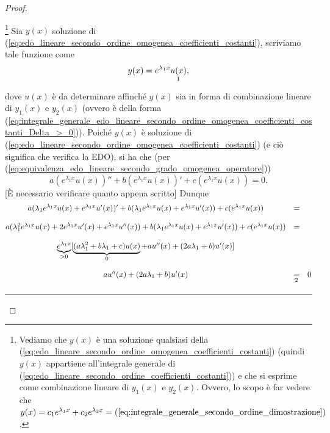 \begin{proof}
\begin{enumerate}
		
		
		\footnote{Vediamo che $y(x)$ è una soluzione qualsiasi della (\ref{eq:edo_lineare_secondo_ordine_omogenea_coefficienti_costanti}) (quindi $y(x)$ appartiene all'integrale generale di (\ref{eq:edo_lineare_secondo_ordine_coefficienti_costanti})) e che si esprime come combinazione lineare di $y_1(x)$ e $y_2(x)$. Ovvero, lo scopo è far vedere che $y(x)=c_1 e^{\lambda_1x}+c_2e^{\lambda_2 x}=(\ref{eq:integrale_generale_secondo_ordine_dimostrazione})$.} Sia $y(x)$ soluzione di  (\ref{eq:edo_lineare_secondo_ordine_omogenea_coefficienti_costanti}), scriviamo tale funzione come
		\begin{equation}\label{eq:integrale_generale_secondo_ordine_dimostrazione}
			y(x) = e^{\lambda_1 x}\underset{\footnotemark}{u(x)},
		\end{equation}
		dove $u(x)$ è da determinare affinché $y(x)$ sia in forma di combinazione lineare di $y_1(x)$ e $y_2(x)$ (ovvero è della forma (\ref{eq:integrale_generale_edo_lineare_secondo_ordine_omogenea_coefficienti_costanti_Delta_>_0})).
		Poiché $y(x)$ è soluzione di  (\ref{eq:edo_lineare_secondo_ordine_omogenea_coefficienti_costanti}) (e ciò significa che verifica la EDO), si ha che (per (\ref{eq:equivalenza_edo_lineare_secondo_grado_omogenea_operatore}))
		\begin{equation*}
			a(e^{\lambda_1x}u(x))''+ b(e^{\lambda_1x}u(x))'+ c (e^{\lambda_1x}u(x)) = 0.
		\end{equation*}
		[È necessario verificare quanto appena scritto] Dunque
		\begin{equation}\label{eq:dimostrazione_th_soluzioni_edo_secondo_ordine}
			\begin{matrix}
				a(\lambda_1e^{\lambda_1x}u(x)+e^{\lambda_1x}u'(x))' + b(\lambda_1 e^{\lambda_1 x}u(x) + e^{\lambda_1x}u'(x)) + c(e^{\lambda_1x}u(x)) &=&\\\\
				a(\lambda_1^2e^{\lambda_1 x}u(x) + 2 e^{\lambda_1 x} u'(x) + e^{\lambda_1 x}u''(x))+ b (\lambda_1 e^{\lambda_1 x}u(x) + e^{\lambda_1 x}u'(x)) + 
				c(e^{\lambda_1 x}u(x)) &=&\\\\
				 \underbrace{e^{\lambda_1 x}}_{>0} [\underbrace{(a\lambda_1^2+b\lambda_1 +c) u(x)}_{0} + a u''(x)+(2a\lambda_1 + b)u'(x)]\\\\
				 a u''(x)+(2a\lambda_1 + b)u'(x) &\underset{\footnotemark}{=}& 0
			\end{matrix}
		\end{equation}
		\hrule\vspace{-12px}

\end{enumerate}
\end{proof}

